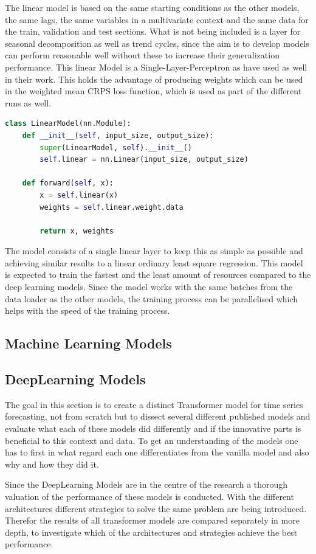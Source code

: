 \documentclass{article}
\begin{document}
The linear model is based on the same starting conditions as the other models, the same lags, the same variables in a multivariate context and the same data for the train, validation and test sections. What is not being included is a layer for seasonal decomposition as well as trend cycles, since the aim is to develop models can perform reasonable well without these to increase their generalization performance. This linear Model is a Single-Layer-Perceptron as \cite{transformers-effectiveness} have used as well in their work. This holds the advantage of producing weights which can be used in the weighted mean CRPS loss function, which is used as part of the different runs as well.
\begin{lstlisting}[language=Python, caption=Single-Layer-Perceptron]
class LinearModel(nn.Module):
    def __init__(self, input_size, output_size):
        super(LinearModel, self).__init__()
        self.linear = nn.Linear(input_size, output_size)

    def forward(self, x):
        x = self.linear(x)
        weights = self.linear.weight.data
        
        return x, weights
\end{lstlisting}\label{code:LinearModel}
The model consists of a single linear layer to keep this as simple as possible and achieving similar results to a linear ordinary least square regression. This model is expected to train the fastest and the least amount of resources compared to the deep learning models. Since the model works with the same batches from the data loader as the other models, the training process can be parallelised which helps with the speed of the training process. 


\subsection{Machine Learning Models}


\subsection{DeepLearning Models}

The goal in this section is to create a distinct Transformer model for time series forecasting, not from scratch but to dissect several different published models and evaluate what each of these models did differently and if the innovative parts is beneficial to this context and data. To get an understanding of the models one has to first in what regard each one differentiates from the vanilla model and also why and how they did it. \par 
Since the DeepLearning Models are in the centre of the research a thorough valuation of the performance of these models is conducted. With the different architectures different strategies to solve the same problem are being introduced. Therefor the results of all transformer models are compared separately in more depth, to investigate which of the architectures and strategies achieve the best performance. 
\end{document}
